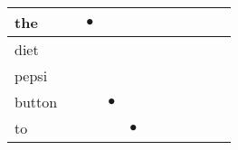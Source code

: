 \documentclass[landscape]{article}
\newcommand{\ssp}{\hspace{2pt}}
\newcommand{\mex}{\cellcolor{g}$\bullet$}
\begin{document}
\begin{tabular}{|l|p{10pt}|p{10pt}|p{10pt}|p{10pt}|p{10pt}|p{10pt}|p{10pt}|p{10pt}|p{10pt}|p{10pt}|}
\hline
\ssp \cellcolor{ref1}the \ssp&\hspace{2pt}&\hspace{2pt}\mex&\hspace{2pt}&\hspace{2pt}&\hspace{2pt}&\hspace{2pt}&\hspace{2pt}&\hspace{2pt}&\hspace{2pt}&\hspace{2pt}\\
\hline
\ssp diet \ssp&\hspace{2pt}&\hspace{2pt}&\hspace{2pt}&\hspace{2pt}&\hspace{2pt}&\hspace{2pt}&\hspace{2pt}&\hspace{2pt}&\hspace{2pt}&\hspace{2pt}\\
\hline
\ssp pepsi \ssp&\hspace{2pt}&\hspace{2pt}&\hspace{2pt}&\hspace{2pt}&\hspace{2pt}&\hspace{2pt}&\hspace{2pt}&\hspace{2pt}&\hspace{2pt}&\hspace{2pt}\\
\hline
\ssp \cellcolor{ref2}button \ssp&\hspace{2pt}&\hspace{2pt}&\hspace{2pt}\mex&\hspace{2pt}&\hspace{2pt}&\hspace{2pt}&\hspace{2pt}&\hspace{2pt}&\hspace{2pt}&\hspace{2pt}\\
\hline
\ssp \cellcolor{ref3}to \ssp&\hspace{2pt}&\hspace{2pt}&\hspace{2pt}&\hspace{2pt}\mex&\hspace{2pt}&\hspace{2pt}&\hspace{2pt}&\hspace{2pt}&\hspace{2pt}&\hspace{2pt}\\

\end{tabular}
\end{document}
